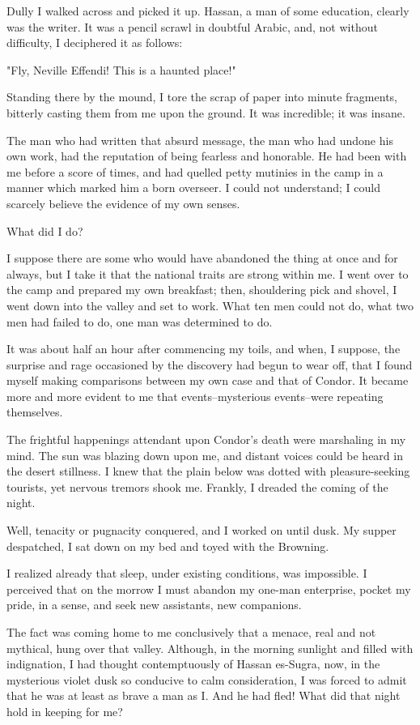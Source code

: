 Dully I walked across and picked it up. Hassan, a man of some
education, clearly was the writer. It was a pencil scrawl in doubtful
Arabic, and, not without difficulty, I deciphered it as follows:

"Fly, Neville Effendi! This is a haunted place!"

Standing there by the mound, I tore the scrap of paper into minute
fragments, bitterly casting them from me upon the ground. It was
incredible; it was insane.

The man who had written that absurd message, the man who had undone
his own work, had the reputation of being fearless and honorable. He
had been with me before a score of times, and had quelled petty
mutinies in the camp in a manner which marked him a born overseer. I
could not understand; I could scarcely believe the evidence of my own
senses.

What did I do?

I suppose there are some who would have abandoned the thing at once
and for always, but I take it that the national traits are strong
within me. I went over to the camp and prepared my own breakfast;
then, shouldering pick and shovel, I went down into the valley and
set to work. What ten men could not do, what two men had failed to do,
one man was determined to do.

It was about half an hour after commencing my toils, and when, I
suppose, the surprise and rage occasioned by the discovery had begun
to wear off, that I found myself making comparisons between my own
case and that of Condor. It became more and more evident to me that
events--mysterious events--were repeating themselves.

The frightful happenings attendant upon Condor's death were marshaling
in my mind. The sun was blazing down upon me, and distant voices could
be heard in the desert stillness. I knew that the plain below was
dotted with pleasure-seeking tourists, yet nervous tremors shook me.
Frankly, I dreaded the coming of the night.

Well, tenacity or pugnacity conquered, and I worked on until dusk. My
supper despatched, I sat down on my bed and toyed with the Browning.

I realized already that sleep, under existing conditions, was
impossible. I perceived that on the morrow I must abandon my one-man
enterprise, pocket my pride, in a sense, and seek new assistants, new
companions.

The fact was coming home to me conclusively that a menace, real and
not mythical, hung over that valley. Although, in the morning sunlight
and filled with indignation, I had thought contemptuously of Hassan
es-Sugra, now, in the mysterious violet dusk so conducive to calm
consideration, I was forced to admit that he was at least as brave a
man as I. And he had fled! What did that night hold in keeping for me?

